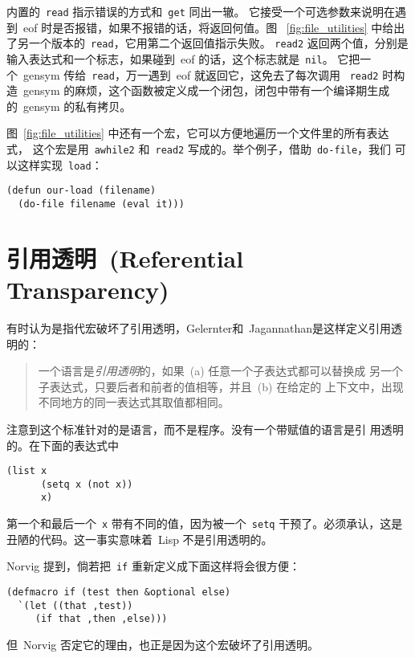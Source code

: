 内置的~\texttt{read} 指示错误的方式和~\texttt{get} 同出一辙。
它接受一个可选参数来说明在遇到~eof 时是否报错，如果不报错的话，将返回何值。图
~\ref{fig:file_utilities} 中给出了另一个版本的~\texttt{read}，它用第二个返回值指示失败。
\texttt{read2} 返回两个值，分别是输入表达式和一个标志，如果碰到~eof 的话，这个标志就是~\texttt{nil}。
它把一个~gensym 传给~\texttt{read}，万一遇到~eof 就返回它，这免去了每次调用
~\texttt{read2} 时构造~gensym 的麻烦，这个函数被定义成一个闭包，闭包中带有一个编译期生成的~gensym 的私有拷贝。

图~\ref{fig:file_utilities} 中还有一个宏，它可以方便地遍历一个文件里的所有表达式，
这个宏是用~\texttt{awhile2} 和~\texttt{read2} 写成的。举个例子，借助~\texttt{do-file}，我们
可以这样实现~\texttt{load}：
\begin{lstlisting}
(defun our-load (filename)
  (do-file filename (eval it)))
\end{lstlisting}

\section{引用透明~(Referential Transparency)}
\label{sec:referential_transparency}

有时认为是指代宏破坏了引用透明，Gelernter和~Jagannathan是这样定义引用透明的：
\begin{quote}
  一个语言是\emph{引用透明}的，如果~(a) 任意一个子表达式都可以替换成
  另一个子表达式，只要后者和前者的值相等，并且~(b) 在给定的
  上下文中，出现不同地方的同一表达式其取值都相同。
\end{quote}

注意到这个标准针对的是语言，而不是程序。没有一个带赋值的语言是引
用透明的。在下面的表达式中
\begin{lstlisting}
(list x
      (setq x (not x))
      x)
\end{lstlisting}
第一个和最后一个~\texttt{x} 带有不同的值，因为被一个~\texttt{setq} 干预了。必须承认，这是丑陋的代码。这一事实意味着~Lisp 不是引用透明的。

Norvig 提到，倘若把~\texttt{if} 重新定义成下面这样将会很方便：
\begin{lstlisting}
(defmacro if (test then &optional else)
  `(let ((that ,test))
     (if that ,then ,else)))
\end{lstlisting}
但~Norvig 否定它的理由，也正是因为这个宏破坏了引用透明。

